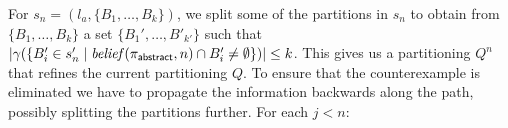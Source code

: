 For $s_n  =(l_a,\{B_1,\ldots,B_k\})$, we split some of the partitions in $s_n$ to obtain from $\{B_1,\ldots,B_k\}$ a set $\{B_1',\ldots, B'_{k'}\}$ such that $|\gamma(\{B_i' \in s_n' \mid \mathit{belief}(\pi_{\mathsf{abstract}}, n) \cap B_i' \neq \emptyset\})| \leq k$.
This gives us a partitioning $Q^n$ that refines the current partitioning $Q$. To ensure that the counterexample is eliminated we have to propagate the information backwards along the path, possibly splitting the partitions further. For each $j < n$:


